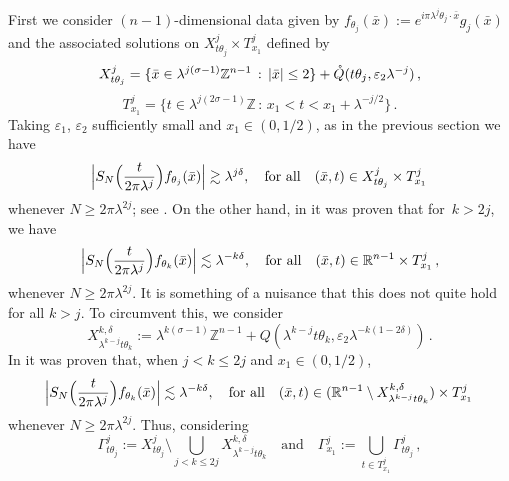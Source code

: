 \documentclass[biblatex]{pzorin-note}
\begin{document}
First we consider $(n-1)$-dimensional data given by $f_{\theta_{j}}(\bar{x}) := e^{ i\pi \lambda^{j} \theta_{j} \cdot \bar{x} }g_{j}(\bar{x})$ and the associated solutions on $X_{t\theta_{j}}^{j} \times
T^{j}_{x_1}$ defined by
\begin{equation*}
X_{t\theta_j}^{j}= \{ \bar{x} \in \lambda^{j(\sigma-1)}\mathbb{Z}^{n-1} \, : \, \abs{\bar{x}} \leq 2 \} + \mathring{Q} ( t\theta_{j}, \varepsilon_{2} \lambda^{-j} ) \, ,
\end{equation*}
\[
T^{j}_{x_1} = \big\{ t\in \lambda^{j(2\sigma-1)}\mathbb{Z}\, : \, x_1<t<x_1+\lambda^{-j/2}\big\} \, .
\]
Taking $\varepsilon_{1}$, $\varepsilon_{2}$ sufficiently small and $x_1\in(0,1/2)$, as in the previous section we have
\begin{equation}\label{GalInvPreq}
\abs[\Big]{ S_{N} \Big( \frac{t}{2\pi \lambda^{j}} \Big) f_{\theta_{j}}(\bar{x}) } \gtrsim \lambda^{j \delta},
\quad
\mbox{for all}
\quad
(\bar{x}, t) \in X^{j}_{t\theta_{j}} \times T^{j}_{x_1} \,
\end{equation}
whenever $N\ge 2\pi \lambda^{2j}$; see \cite[eq. 18]{LuR2}.
On the other hand, in \cite[eq. 20]{LuR2} it was proven that for~$k > 2j$, we have \begin{equation}\label{GIPBIS2}
\abs[\Big]{ S_{N} \Big( \frac{t}{2\pi \lambda^{j}} \Big) f_{\theta_{k}}(\bar{x}) }
\lesssim
\lambda^{-k \delta},
\quad
\mbox{for all}
\quad
(\bar{x}, t) \in \R^{n-1} \times T^{j}_{x_1} \, ,
\end{equation}
whenever $N\ge 2\pi \lambda^{2j}$. It is something of a nuisance that this does not quite hold for all $k>j$. To circumvent this, we consider
\begin{equation}\nonumber
X^{k, \delta}_{\lambda^{k-j} t\theta_{k}} :=\lambda^{k(\sigma-1)} \mathbb{Z}^{n-1} + Q(\lambda^{k-j} t \theta_{k},\varepsilon_{2} \lambda^{-k(1 - 2\delta)}) \, .
\end{equation}
In \cite[eq. 19]{LuR2} it was proven that, when $j<k\le 2j$ and $x_1\in(0,1/2)$,
\begin{equation}\label{GIPBIS}
\abs[\Big]{ S_{N} \Big( \frac{t}{2\pi \lambda^{j}} \Big) f_{\theta_{k}}(\bar{x}) }
\lesssim
\lambda^{-k \delta},
\quad
\mbox{for all}
\quad
(\bar{x}, t) \in ( \R^{n-1} \setminus X^{k, \delta}_{\lambda^{k-j} t\theta_{k}} ) \times T^{j}_{x_1} \,
\end{equation}
whenever $N\ge 2\pi \lambda^{2j}$.
Thus, considering
\begin{equation*}
\Gamma_{\!t\theta_{j}}^{j} := X_{t\theta_{j}}^{j} \setminus \bigcup_{j<k \le 2j } X^{k, \delta}_{\lambda^{k-j} t\theta_{k}}\quad \mbox{and}\quad
\Gamma^{j}_{\!x_1} := \bigcup_{ t \in T^{j}_{x_1} } \Gamma_{\!t \theta_{j}}^{j} \, ,
\end{equation*}
\end{document}
